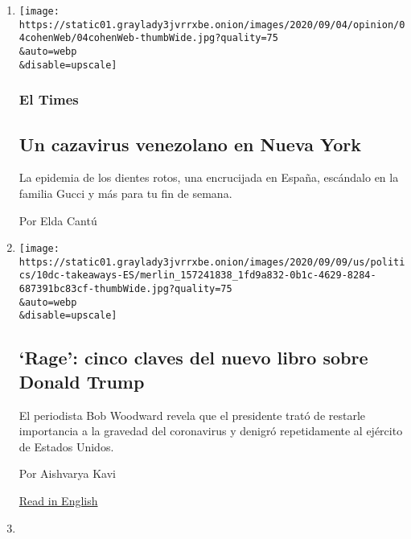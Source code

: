 \begin{enumerate}
\def\labelenumi{\arabic{enumi}.}
\item
  \href{/es/2020/09/11/espanol/trump-woodward-coronavirus.html}{}

  \texttt{[image: https://static01.graylady3jvrrxbe.onion/images/2020/09/04/opinion/04cohenWeb/04cohenWeb-thumbWide.jpg?quality=75\\\&auto=webp\\\&disable=upscale]}

  \hypertarget{el-times}{%
  \subsubsection{El Times}\label{el-times}}

  \hypertarget{un-cazavirus-venezolano-en-nueva-york}{%
  \subsection{Un cazavirus venezolano en Nueva
  York}\label{un-cazavirus-venezolano-en-nueva-york}}

  La epidemia de los dientes rotos, una encrucijada en España, escándalo
  en la familia Gucci y más para tu fin de semana.

  Por Elda Cantú
\item
  \href{/es/2020/09/10/espanol/estados-unidos/bob-woodward-trump-rage.html}{}

  \texttt{[image: https://static01.graylady3jvrrxbe.onion/images/2020/09/09/us/politics/10dc-takeaways-ES/merlin\_157241838\_1fd9a832-0b1c-4629-8284-687391bc83cf-thumbWide.jpg?quality=75\\\&auto=webp\\\&disable=upscale]}

  \hypertarget{rage-cinco-claves-del-nuevo-libro-sobre-donald-trump}{%
  \subsection{`Rage': cinco claves del nuevo libro sobre Donald
  Trump}\label{rage-cinco-claves-del-nuevo-libro-sobre-donald-trump}}

  El periodista Bob Woodward revela que el presidente trató de restarle
  importancia a la gravedad del coronavirus y denigró repetidamente al
  ejército de Estados Unidos.

  Por Aishvarya Kavi

  \href{https://www.nytimes3xbfgragh.onion/2020/09/09/us/politics/woodward-trump-rage-takeaways.html}{Read
  in English}
\item
  \href{/es/2020/09/10/espanol/deportes/barcelona-bartomeu.html}{}


\end{enumerate}
